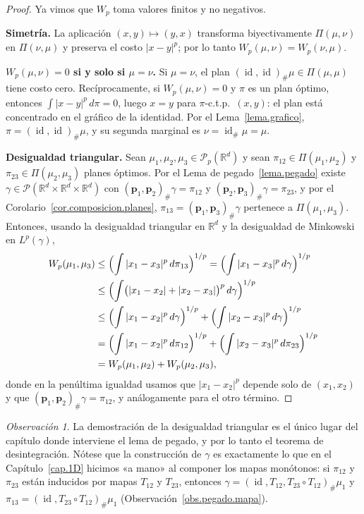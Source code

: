 \documentclass[12pt, a4paper]{amsbook}
\newcommand{\id}{\operatorname{id}}
\newcommand{\R}{{\mathbb R}}
\newcommand{\pp}{{\mathbf p}}
\theoremstyle{remark}
\newtheorem{obs}[teo]{Observación}
\theoremstyle{definition}
\numberwithin{section}{chapter}
\numberwithin{subsection}{section}
\numberwithin{equation}{section}
\numberwithin{figure}{chapter}
\begin{document}
\begin{proof}
Ya vimos que $W_p$ toma valores finitos y no negativos.

\medskip
\textbf{Simetría.} La aplicación $(x,y)\mapsto(y,x)$ transforma
biyectivamente $\Pi(\mu,\nu)$ en $\Pi(\nu,\mu)$ y preserva el costo
$|x-y|^p$; por lo tanto $W_p(\mu,\nu)=W_p(\nu,\mu)$.

\medskip
\textbf{$W_p(\mu,\nu)=0$ si y solo si $\mu=\nu$.} Si $\mu=\nu$, el plan
$(\id,\id)_\#\mu\in\Pi(\mu,\mu)$ tiene costo cero. Recíprocamente, si
$W_p(\mu,\nu)=0$ y $\pi$ es un plan óptimo, entonces $\int|x-y|^p\,d\pi=0$,
luego $x=y$ para $\pi$-c.t.p.\ $(x,y)$: el plan está concentrado en el gráfico
de la identidad. Por el Lema~\ref{lema.grafico}, $\pi=(\id,\id)_\#\mu$, y su
segunda marginal es $\nu=\id_\#\mu=\mu$.

\medskip
\textbf{Desigualdad triangular.} Sean $\mu_1,\mu_2,\mu_3\in\mathcal P_p(\R^d)$
y sean $\pi_{12}\in\Pi(\mu_1,\mu_2)$ y $\pi_{23}\in\Pi(\mu_2,\mu_3)$ planes
óptimos. Por el Lema de pegado~\ref{lema.pegado} existe
$\gamma\in\mathcal P(\R^d\times\R^d\times\R^d)$ con
$(\pp_1,\pp_2)_\#\gamma=\pi_{12}$ y $(\pp_2,\pp_3)_\#\gamma=\pi_{23}$, y por el
Corolario~\ref{cor.composicion.planes}, $\pi_{13}=(\pp_1,\pp_3)_\#\gamma$
pertenece a $\Pi(\mu_1,\mu_3)$. Entonces, usando la desigualdad triangular en
$\R^d$ y la desigualdad de Minkowski en $L^p(\gamma)$,
\[
\begin{aligned}
W_p(\mu_1,\mu_3)
&\le\Bigl(\int|x_1-x_3|^p\,d\pi_{13}\Bigr)^{1/p}
=\Bigl(\int|x_1-x_3|^p\,d\gamma\Bigr)^{1/p}
\\
&\le\Bigl(\int\bigl(|x_1-x_2|+|x_2-x_3|\bigr)^p\,d\gamma\Bigr)^{1/p}
\\
&\le\Bigl(\int|x_1-x_2|^p\,d\gamma\Bigr)^{1/p}+\Bigl(\int|x_2-x_3|^p\,d\gamma\Bigr)^{1/p}
\\
&=\Bigl(\int|x_1-x_2|^p\,d\pi_{12}\Bigr)^{1/p}+\Bigl(\int|x_2-x_3|^p\,d\pi_{23}\Bigr)^{1/p}\\
&=W_p(\mu_1,\mu_2)+W_p(\mu_2,\mu_3),
\end{aligned}
\]
donde en la penúltima igualdad usamos que $|x_1-x_2|^p$ depende solo de
$(x_1,x_2)$ y que $(\pp_1,\pp_2)_\#\gamma=\pi_{12}$, y análogamente para el
otro término.
\end{proof}

\begin{obs}
La demostración de la desigualdad triangular es el único lugar del capítulo
donde interviene el lema de pegado, y por lo tanto el teorema de
desintegración. Nótese que la construcción de $\gamma$ es exactamente lo que
en el Capítulo~\ref{cap.1D} hicimos «a mano» al componer los mapas monótonos:
si $\pi_{12}$ y $\pi_{23}$ están inducidos por mapas $T_{12}$ y $T_{23}$,
entonces $\gamma=(\id,T_{12},T_{23}\circ T_{12})_\#\mu_1$ y
$\pi_{13}=(\id,T_{23}\circ T_{12})_\#\mu_1$ (Observación~\ref{obs.pegado.mapa}).
\end{obs}
\end{document}
